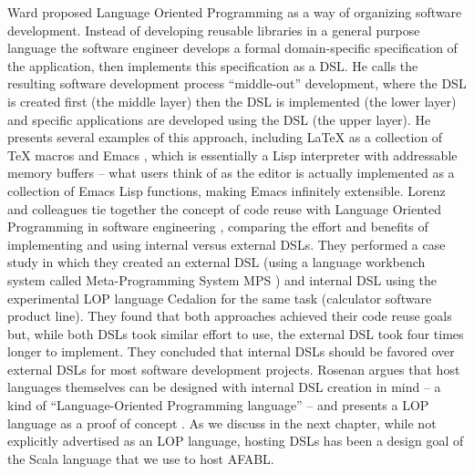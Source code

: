 Ward \cite{ward1994language} proposed Language Oriented Programming as a way of organizing software development. Instead of developing reusable libraries in a general purpose language the software engineer develops a formal domain-specific specification of the application, then implements this specification as a DSL. He calls the resulting software development process ``middle-out'' development, where the DSL is created first (the middle layer) then the DSL is implemented (the lower layer) and specific applications are developed using the DSL (the upper layer). He presents several examples of this approach, including \LaTeX \cite{lamport1986document} as a collection of \TeX \cite{knuth1984texbook} macros and Emacs \cite{stallman2014emacs}, which is essentially a Lisp interpreter with addressable memory buffers -- what users think of as the editor is actually implemented as a collection of Emacs Lisp functions, making Emacs infinitely extensible.
Lorenz and colleagues tie together the concept of code reuse with Language Oriented Programming in software engineering \cite{lorenz2011a-code}, comparing the effort and benefits of implementing and using internal versus external DSLs. They performed a case study in which they created an external DSL (using a language workbench system called Meta-Programming System MPS \cite{dmitriev2004language}) and internal DSL using the experimental LOP language Cedalion \cite{rosenan2010designing} for the same task (calculator software product line). They found that both approaches achieved their code reuse goals but, while both DSLs took similar effort to use, the external DSL took four times longer to implement. They concluded that internal DSLs should be favored over external DSLs for most software development projects. Rosenan argues that host languages themselves can be designed with internal DSL creation in mind -- a kind of ``Language-Oriented Programming language'' -- and presents a LOP language as a proof of concept \cite{rosenan2010designing}. As we discuss in the next chapter, while not explicitly advertised as an LOP language, hosting DSLs has been a design goal of the Scala language that we use to host AFABL.










